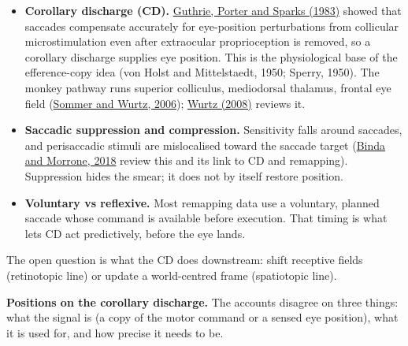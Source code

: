 \documentclass[11pt,a4paper]{article}
\begin{document}
\begin{itemize}[itemsep=2pt,topsep=2pt]
\item \textbf{Corollary discharge (CD).} \href{https://www.jstor.org/stable/1690996}{Guthrie, Porter and Sparks (1983)} showed that saccades compensate accurately for eye-position perturbations from collicular microstimulation even after extraocular proprioception is removed, so a corollary discharge supplies eye position. This is the physiological base of the efference-copy idea (von Holst and Mittelstaedt, 1950; Sperry, 1950). The monkey pathway runs superior colliculus, mediodorsal thalamus, frontal eye field (\href{https://www.nature.com/articles/nature05279}{Sommer and Wurtz, 2006}); \href{https://pubmed.ncbi.nlm.nih.gov/18513781/}{Wurtz (2008)} reviews it.
\item \textbf{Saccadic suppression and compression.} Sensitivity falls around saccades, and perisaccadic stimuli are mislocalised toward the saccade target (\href{https://www.annualreviews.org/content/journals/10.1146/annurev-vision-091517-034317}{Binda and Morrone, 2018} review this and its link to CD and remapping). Suppression hides the smear; it does not by itself restore position.
\item \textbf{Voluntary vs reflexive.} Most remapping data use a voluntary, planned saccade whose command is available before execution. That timing is what lets CD act predictively, before the eye lands.
\end{itemize}

The open question is what the CD does downstream: shift receptive fields (retinotopic line) or update a world-centred frame (spatiotopic line).

\textbf{Positions on the corollary discharge.} The accounts disagree on three things: what the signal is (a copy of the motor command or a sensed eye position), what it is used for, and how precise it needs to be.
\end{document}
